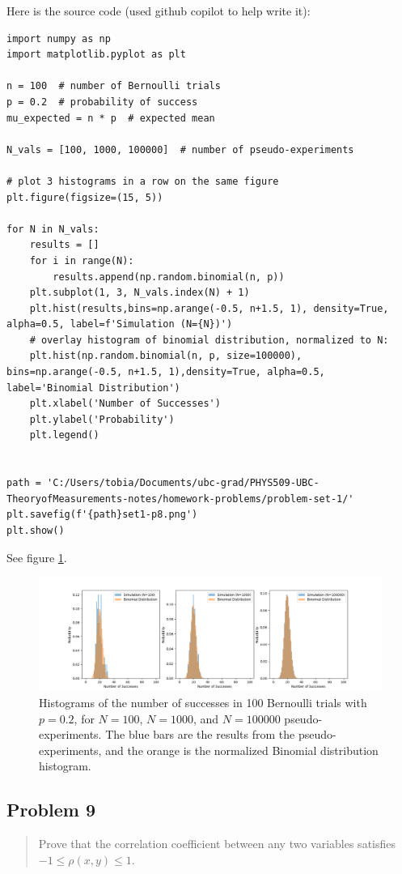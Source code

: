 \documentclass[10pt]{article}
\begin{document}
\divider

Here is the source code (used github copilot to help write it):

\begin{verbatim}
import numpy as np
import matplotlib.pyplot as plt

n = 100  # number of Bernoulli trials
p = 0.2  # probability of success
mu_expected = n * p  # expected mean

N_vals = [100, 1000, 100000]  # number of pseudo-experiments

# plot 3 histograms in a row on the same figure
plt.figure(figsize=(15, 5))

for N in N_vals:
    results = []
    for i in range(N):
        results.append(np.random.binomial(n, p))
    plt.subplot(1, 3, N_vals.index(N) + 1)
    plt.hist(results,bins=np.arange(-0.5, n+1.5, 1), density=True, alpha=0.5, label=f'Simulation (N={N})')
    # overlay histogram of binomial distribution, normalized to N:
    plt.hist(np.random.binomial(n, p, size=100000), bins=np.arange(-0.5, n+1.5, 1),density=True, alpha=0.5, label='Binomial Distribution')
    plt.xlabel('Number of Successes')
    plt.ylabel('Probability')
    plt.legend()


path = 'C:/Users/tobia/Documents/ubc-grad/PHYS509-UBC-TheoryofMeasurements-notes/homework-problems/problem-set-1/'
plt.savefig(f'{path}set1-p8.png')
plt.show()
\end{verbatim}

See figure \ref{fig:bernoulli}.

\begin{figure}
	\centering
	\includegraphics[width=\textwidth]{set1-p8.png}
	\caption{Histograms of the number of successes in 100 Bernoulli trials with $p=0.2$, for $N=100$, $N=1000$, and $N=100000$ pseudo-experiments. The blue bars are the results from the pseudo-experiments, and the orange is the normalized Binomial distribution histogram.}
	\label{fig:bernoulli}
\end{figure}

\subsection*{Problem 9}
\begin{quote}
	Prove that the correlation coefficient between any two variables satisfies $-1\le \rho(x,y)\le 1$.
\end{quote}
\end{document}
